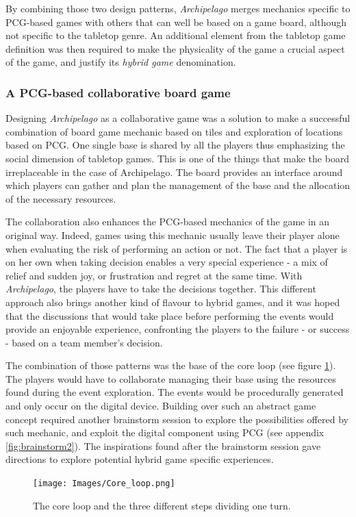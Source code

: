 By combining those two design patterns, \textit{Archipelago} merges mechanics specific to PCG-based games with others that can well be based on a game board, although not specific to the tabletop genre. An additional element from the tabletop game definition was then required to make the physicality of the game a crucial aspect of the game, and justify its \textit{hybrid game} denomination.

\subsubsection{A PCG-based collaborative board game}

Designing \textit{Archipelago} as a collaborative game was a solution to make a successful combination of board game mechanic based on tiles and exploration of locations based on PCG. One single base is shared by all the players thus emphasizing the social dimension of tabletop games. This is one of the things that make the board irreplaceable in the case of Archipelago. The board provides an interface around which players can gather and plan the management of the base and the allocation of the necessary resources.

The collaboration also enhances the PCG-based mechanics of the game in an original way. Indeed, games using this mechanic usually leave their player alone when evaluating the risk of performing an action or not. The fact that a player is on her own when taking decision enables a very special experience - a mix of relief and sudden joy, or frustration and regret at the same time. With \textit{Archipelago}, the players have to take the decisions together. This different approach also brings another kind of flavour to hybrid games, and it was hoped that the discussions that would take place before performing the events would provide an enjoyable experience, confronting the players to the failure - or success - based on a team member's decision.

The combination of those patterns was the base of the core loop (see figure \ref{fig:loop}). The players would have to collaborate managing their base using the resources found during the event exploration. The events would be procedurally generated and only occur on the digital device. Building over such an abstract game concept required another brainstorm session to explore the possibilities offered by such mechanic, and exploit the digital component using PCG (see appendix \ref{fig:brainstorm2}). The inspirations found after the brainstorm session gave directions to explore potential hybrid game specific experiences.
\begin{figure}[h]
    \centering
    \texttt{[image: Images/Core\_loop.png]}
    \caption{The core loop and the three different steps dividing one turn.}
    \label{fig:loop}
\end{figure}
